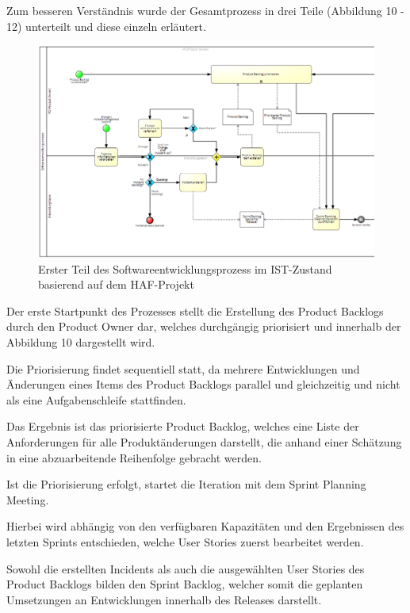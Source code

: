 Zum besseren Verständnis wurde der Gesamtprozess in drei Teile (Abbildung 10 - 12) unterteilt und diese einzeln erläutert.\\

\begin{figure}[h]
    \centering
    \includegraphics[scale=0.5]{Bilder/IST-Prozess_first Part.png}
    \caption{Erster Teil des Softwareentwicklungsprozess im IST-Zustand basierend auf dem HAF-Projekt}
\end{figure}

Der erste Startpunkt des Prozesses stellt die Erstellung des Product Backlogs durch den Product Owner dar, welches durchgängig priorisiert und innerhalb der Abbildung 10 dargestellt wird. 

Die Priorisierung findet sequentiell statt, da mehrere Entwicklungen und Änderungen eines Items des Product Backlogs parallel und gleichzeitig und nicht als eine Aufgabenschleife stattfinden. 

Das Ergebnis ist das priorisierte Product Backlog, welches eine Liste der Anforderungen für alle Produktänderungen darstellt, die anhand einer Schätzung in eine abzuarbeitende Reihenfolge gebracht werden. 

Ist die Priorisierung erfolgt, startet die Iteration mit dem Sprint Planning Meeting. 

Hierbei wird abhängig von den verfügbaren Kapazitäten und den Ergebnissen des letzten Sprints entschieden, welche User Stories zuerst bearbeitet werden. 

Sowohl die erstellten Incidents als auch die ausgewählten User Stories des Product Backlogs bilden den Sprint Backlog, welcher somit die geplanten Umsetzungen an Entwicklungen innerhalb des Releases darstellt.

